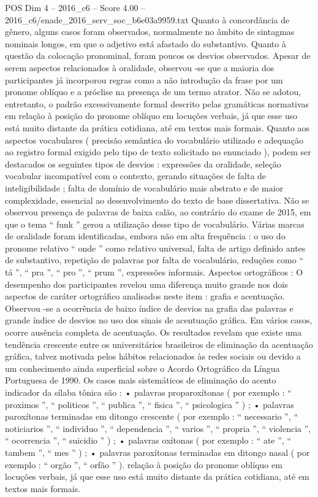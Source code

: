 \begin{textsample}{POS Dim 4 – 2016\_c6 – Score 4.00 – 2016\_c6/enade\_2016\_serv\_soc\_b6e03a9959.txt}
Quanto à concordância de gênero, alguns casos foram observados, normalmente no âmbito de sintagmas nominais longos, em que o adjetivo está afastado do substantivo.
Quanto à questão da colocação pronominal, foram poucos os desvios observados.
Apesar de serem aspectos relacionados à oralidade, observou -se que a maioria dos participantes já incorporou regras como a não introdução da frase por um pronome oblíquo e a próclise na presença de um termo atrator.
Não se adotou, entretanto, o padrão excessivamente formal descrito pelas gramáticas normativas em relação à posição do pronome oblíquo em locuções verbais, já que esse uso está muito distante da prática cotidiana, até em textos mais formais.
Quanto aos aspectos vocabulares ( precisão semântica do vocabulário utilizado e adequação ao registro formal exigido pelo tipo de texto solicitado no enunciado ), podem ser destacados os seguintes tipos de desvios : expressões da oralidade, seleção vocabular incompatível com o contexto, gerando situações de falta de inteligibilidade ; falta de domínio de vocabulário mais abstrato e de maior complexidade, essencial ao desenvolvimento do texto de base dissertativa.
Não se observou presença de palavras de baixa calão, ao contrário do exame de 2015, em que o tema “ funk ” gerou a utilização desse tipo de vocabulário.
Várias marcas de oralidade foram identificadas, embora não em alta frequência : o uso do pronome relativo “ onde ” como relativo universal, falta de artigo definido antes de substantivo, repetição de palavras por falta de vocabulário, reduções como “ tá ”, “ pra ”, “ pro ”, “ prum ”, expressões informais.
Aspectos ortográficos : O desempenho dos participantes revelou uma diferença muito grande nos dois aspectos de caráter ortográfico analisados neste item : grafia e acentuação.
Observou -se a ocorrência de baixo índice de desvios na grafia das palavras e grande índice de desvios no uso dos sinais de acentuação gráfica.
Em vários casos, ocorre ausência completa de acentuação.
Os resultados revelam que existe uma tendência crescente entre os universitários brasileiros de eliminação da acentuação gráfica, talvez motivada pelos hábitos relacionados às redes sociais ou devido a um conhecimento ainda superficial sobre o Acordo Ortográfico da Língua Portuguesa de 1990.
Os casos mais sistemáticos de eliminação do acento indicador da sílaba tônica são : • palavras proparoxítonas ( por exemplo : “ proximos ”, “ politicos ”, “ publica ”, “ fisica ”, “ psicologica ” ) ; • palavras paroxítonas terminadas em ditongo crescente ( por exemplo : “ necessario ”, “ noticiarios ”, “ individuo ”, “ dependencia ”, “ varios ”, “ propria ”, “ violencia ”, “ ocorrencia ”, “ suicidio ” ) ; • palavras oxítonas ( por exemplo : “ ate ”, “ tambem ”, “ mes ” ) ; • palavras paroxítonas terminadas em ditongo nasal ( por exemplo : “ orgão ”, “ orfão ” ). relação à posição do pronome oblíquo em locuções verbais, já que esse uso está muito distante da prática cotidiana, até em textos mais formais.

\end{textsample}
